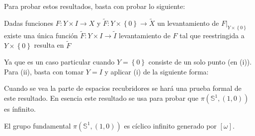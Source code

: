 \documentclass[12pt]{report}
\theoremstyle{largebreak}
\newcommand\cf[3]{\ensuremath{#1:#2\rightarrow#3}}
\begin{document}
    Para probar estos resultados, basta con probar lo siguiente:

    \begin{propo}
        Dadas funciones $\cf{F}{Y\times I}{X}$ y $\cf{\widetilde{F}}{Y\times\left\{0\right\}}{\widetilde{X}}$ un levantamiento de $F\big|_{Y\times\left\{0\right\}}$ existe una única función $\cf{\widetilde{F}}{Y\times I}{\widetilde{I}}$ levantamiento de $F$ tal que reestringida a $Y\times\left\{0\right\}$ resulta en $\widetilde{F}$
    \end{propo}

    Ya que es un caso particular cuando $Y=\left\{0\right\}$ consiste de un solo punto (en (i)). Para (ii), basta con tomar $Y=I$ y aplicar (i) de la siguiente forma: 


    Cuando se vea la parte de espacios recubridores se hará una prueba formal de este resultado. En esencia este resultado se usa para probar que $\pi(\mathbb{S}^1,(1,0))$ es ínfinito.

    \begin{theor}
        El grupo fundamental $\pi(\mathbb{S}^1,(1,0))$ es cíclico infinito generado por $[\omega]$.
    \end{theor}
\end{document}
